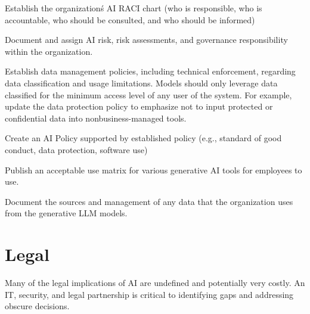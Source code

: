 \begin{minipage}{\linewidth}
\begin{checklist}
  \item Establish the organization\'s AI RACI chart (who is responsible, who is accountable, who should be consulted, and who should be informed)
  \item Document and assign AI risk, risk assessments, and governance responsibility within the organization.
  \item Establish data management policies, including technical enforcement, regarding data classification and usage limitations. Models should only leverage data classified for the minimum access level of any user of the system. For example, update the data protection policy to emphasize not to input protected or confidential data into nonbusiness-managed tools.
  \item Create an AI Policy supported by established policy (e.g., standard of good conduct, data protection, software use)
  \item Publish an acceptable use matrix for various generative AI tools for employees to use.
  \item Document the sources and management of any data that the organization uses from the generative LLM models.
\end{checklist}
\end{minipage}

\clearpage
\section{Legal}
Many of the legal implications of AI are undefined and potentially very costly.
An IT, security, and legal partnership is critical to identifying gaps and
addressing obscure decisions.

